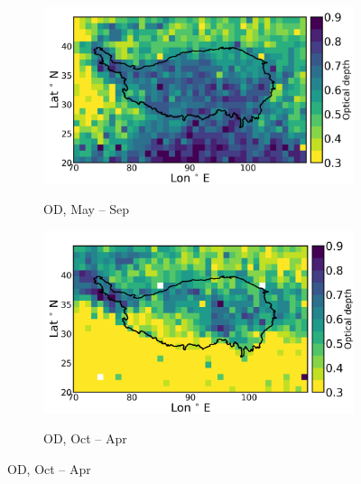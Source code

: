 \documentclass[alpha-refs]{wiley-article}
\begin{document}
\begin{figure}[!htbp]
\centering
        \begin{subfigure}[b]{0.5\textwidth}
       \centering
        \caption{OD, May -- Sep }       
        \includegraphics[width=\textwidth]{optical_depth_monsoonseason.png}
        \label{fig:od1}
    \end{subfigure}%
    \begin{subfigure}[b]{0.5\textwidth}
        \centering
        \caption{OD, Oct -- Apr} 
        \includegraphics[width=\textwidth]{optical_depth_westerlyseason.png}
         \label{fig:od2}
    \end{subfigure}   
    

\end{figure}
\end{document}
